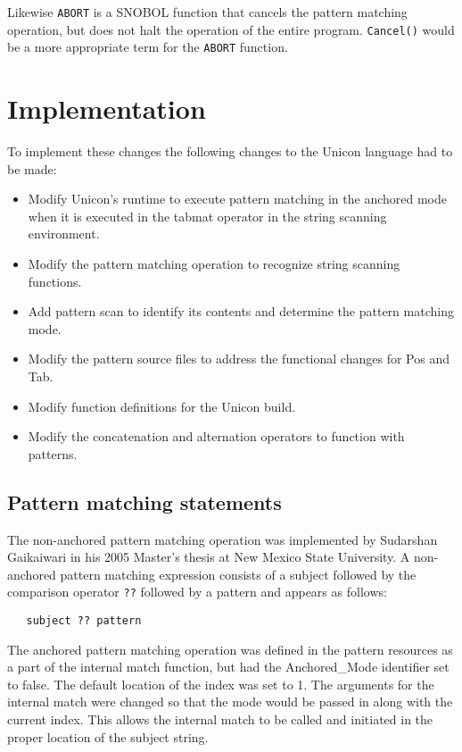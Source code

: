 \documentclass{article}
\begin{document}
Likewise \texttt{ABORT} is a SNOBOL function that cancels the pattern matching operation, but does not halt the operation of the entire program.  \texttt{Cancel()} would be a more appropriate term for the \texttt{ABORT} function. 

\section{Implementation}
To implement these changes the following changes to the Unicon language had to be made:
\begin{itemize}
\item Modify Unicon's runtime to execute pattern matching in the anchored mode when it is executed in the tabmat operator in the string scanning environment.
\item Modify the pattern matching operation to recognize string scanning functions.
\item Add pattern scan to identify its contents and determine the pattern matching mode.
\item Modify the pattern source files to address the functional changes for Pos and Tab.
\item Modify function definitions for the Unicon build.
\item Modify the concatenation and alternation operators to function with patterns.
\end{itemize}

\subsection{Pattern matching statements}
The non-anchored pattern matching operation was implemented by Sudarshan Gaikaiwari in his 2005 Master's thesis at New Mexico State University.  A non-anchored pattern matching expression consists of a subject followed by the comparison operator \texttt{??} followed by a pattern and appears as follows:

\begin{verbatim}
   subject ?? pattern
\end{verbatim}

The anchored pattern matching operation was defined in the pattern resources as a part of the internal match function, but had the Anchored\_Mode identifier set to false.  The default location of the index was set to 1.  The arguments for the internal match were changed so that the mode would be passed in along with the current index.  This allows the internal match to be called and initiated in the proper location of the subject string.
\end{document}
